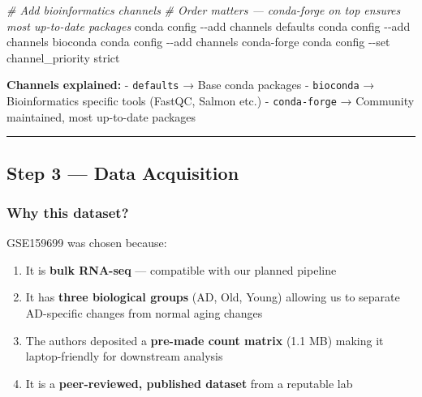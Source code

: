 \documentclass[
]{article}
\newenvironment{Shaded}{\begin{snugshade}}{\end{snugshade}}
\newcommand{\AttributeTok}[1]{\textcolor[rgb]{0.13,0.29,0.53}{#1}}
\newcommand{\CommentTok}[1]{\textcolor[rgb]{0.56,0.35,0.01}{\textit{#1}}}
\newcommand{\ExtensionTok}[1]{#1}
\newcommand{\NormalTok}[1]{#1}
\providecommand{\tightlist}{%
  \setlength{\itemsep}{0pt}\setlength{\parskip}{0pt}}
\begin{document}
\begin{Shaded}
\begin{Highlighting}[]
\CommentTok{\# Add bioinformatics channels}
\CommentTok{\# Order matters — conda{-}forge on top ensures most up{-}to{-}date packages}
\ExtensionTok{conda}\NormalTok{ config }\AttributeTok{{-}{-}add}\NormalTok{ channels defaults}
\ExtensionTok{conda}\NormalTok{ config }\AttributeTok{{-}{-}add}\NormalTok{ channels bioconda}
\ExtensionTok{conda}\NormalTok{ config }\AttributeTok{{-}{-}add}\NormalTok{ channels conda{-}forge}
\ExtensionTok{conda}\NormalTok{ config }\AttributeTok{{-}{-}set}\NormalTok{ channel\_priority strict}
\end{Highlighting}
\end{Shaded}

\textbf{Channels explained:} - \texttt{defaults} → Base conda packages -
\texttt{bioconda} → Bioinformatics specific tools (FastQC, Salmon etc.)
- \texttt{conda-forge} → Community maintained, most up-to-date packages

\begin{center}\rule{0.5\linewidth}{0.5pt}\end{center}

\subsection{Step 3 --- Data Acquisition}\label{step-3-data-acquisition}

\subsubsection{Why this dataset?}\label{why-this-dataset}

GSE159699 was chosen because:

\begin{enumerate}
\def\labelenumi{\arabic{enumi}.}
\tightlist
\item
  It is \textbf{bulk RNA-seq} --- compatible with our planned pipeline
\item
  It has \textbf{three biological groups} (AD, Old, Young) allowing us
  to separate AD-specific changes from normal aging changes
\item
  The authors deposited a \textbf{pre-made count matrix} (1.1 MB) making
  it laptop-friendly for downstream analysis
\item
  It is a \textbf{peer-reviewed, published dataset} from a reputable lab
\end{enumerate}
\end{document}
